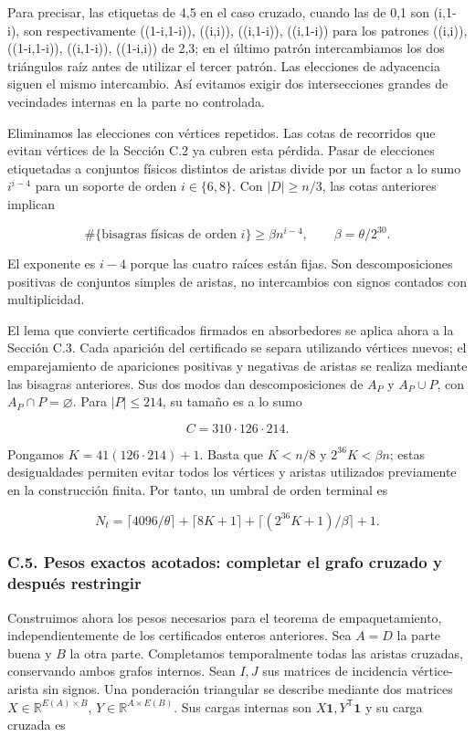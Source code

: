 \documentclass[spanish,11pt,a4paper]{article}
\begin{document}
Para precisar, las etiquetas de 4,5 en el caso cruzado, cuando las de 0,1 son (i,1-i), son respectivamente ((1-i,1-i)), ((i,i)), ((i,1-i)), ((i,1-i)) para los patrones ((i,i)), ((1-i,1-i)), ((i,1-i)), ((1-i,i)) de 2,3; en el último patrón intercambiamos los dos triángulos raíz antes de utilizar el tercer patrón. Las elecciones de adyacencia siguen el mismo intercambio. Así evitamos exigir dos intersecciones grandes de vecindades internas en la parte no controlada.

Eliminamos las elecciones con vértices repetidos. Las cotas de recorridos que evitan vértices de la Sección C.2 ya cubren esta pérdida. Pasar de elecciones etiquetadas a conjuntos físicos distintos de aristas divide por un factor a lo sumo \(i^{i-4}\) para un soporte de orden \(i\in\{6,8\}\). Con \(|D|\ge n/3\), las cotas anteriores implican

\[\#\{\text{bisagras físicas de orden }i\}
\ge\beta n^{i-4},\qquad \beta=\theta/2^{30}.
\tag{C.4.1}\]

El exponente es \(i-4\) porque las cuatro raíces están fijas. Son descomposiciones positivas de conjuntos simples de aristas, no intercambios con signos contados con multiplicidad.

El lema que convierte certificados firmados en absorbedores se aplica ahora a la Sección C.3. Cada aparición del certificado se separa utilizando vértices nuevos; el emparejamiento de apariciones positivas y negativas de aristas se realiza mediante las bisagras anteriores. Sus dos modos dan descomposiciones de \(A_P\) y \(A_P\cup P\), con \(A_P\cap P=\varnothing\). Para \(|P|\le214\), su tamaño es a lo sumo

\[C=310\cdot126\cdot214.
\tag{C.4.2}\]

Pongamos \(K=41(126\cdot214)+1\). Basta que \(K<n/8\) y \(2^{36}K<\beta n\); estas desigualdades permiten evitar todos los vértices y aristas utilizados previamente en la construcción finita. Por tanto, un umbral de orden terminal es

\[N_t=\lceil4096/\theta\rceil+\lceil8K+1\rceil
+\lceil(2^{36}K+1)/\beta\rceil+1.
\tag{C.4.3}\]

\subsubsection{C.5. Pesos exactos acotados: completar el grafo cruzado y después restringir}\label{c.5.-pesos-exactos-acotados-completar-el-grafo-cruzado-y-despuuxe9s-restringir}

Construimos ahora los pesos necesarios para el teorema de empaquetamiento, independientemente de los certificados enteros anteriores. Sea \(A=D\) la parte buena y \(B\) la otra parte. Completamos temporalmente todas las aristas cruzadas, conservando ambos grafos internos. Sean \(I,J\) sus matrices de incidencia vértice-arista sin signos. Una ponderación triangular se describe mediante dos matrices \(X\in\mathbb R^{E(A)\times B}\), \(Y\in\mathbb R^{A\times E(B)}\). Sus cargas internas son \(X\mathbf1,Y^{\mathsf T}\mathbf1\) y su carga cruzada es
\end{document}
